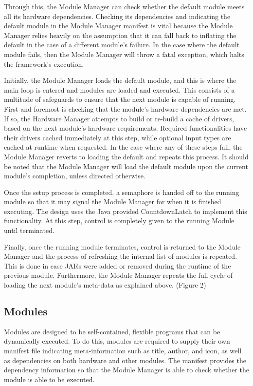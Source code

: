 \documentclass[11pt,letterpaper]{article}
\begin{document}
	Through this, the Module Manager can check whether the default module 
	meets all its hardware dependencies. Checking its dependencies and 
	indicating the default module in the Module Manager manifest is vital 
	because the Module Manager relies heavily on the assumption that it can 
	fall back to inflating the default in the case of a different module's 
	failure. In the case where the default module fails, then the Module 
	Manager will throw a fatal exception, which halts the framework's execution.

	Initially, the Module Manager loads the default module, and this is where 
	the main loop is entered and modules are loaded and executed. This 
	consists of a multitude of safeguards to ensure that the next module is 
	capable of running. First and foremost is checking that the module's 
	hardware dependencies are met. If so, the Hardware Manager attempts to 
	build or re-build a cache of drivers, based on the next module's hardware 
	requirements. Required functionalities have their drivers cached 
	immediately at this step, while optional input types are cached at runtime 
	when requested. In the case where any of these steps fail,  the Module 
	Manager reverts to loading the default and repeats this process. It should 
	be noted that the Module Manager will load the default module upon the 
	current module's completion, unless directed otherwise.

	Once the setup process is completed, a semaphore is handed off to the 
	running module so that it may signal the Module Manager for when it is 
	finished executing. The design uses the Java provided CountdownLatch to 
	implement this functionality. At this step, control is completely given to 
	the running Module until terminated.

	Finally, once the running module terminates, control is returned to the 
	Module Manager and the process of refreshing the internal list of modules 
	is repeated. This is done in case JARs were added or removed during the 
	runtime of the previous module. Furthermore, the Module Manager repeats 
	the full cycle of loading the next module's meta-data as explained above.
	(Figure 2)

	\subsection{Modules}

	Modules are designed to be self-contained, flexible programs that can be 
	dynamically executed. To do this, modules are required to supply their own 
	manifest file indicating meta-information such as title, author, and icon, 
	as well as dependencies on both hardware and other modules. The manifest 
	provides the dependency information so that the Module Manager is able to 
	check whether the module is able to be executed.
\end{document}

